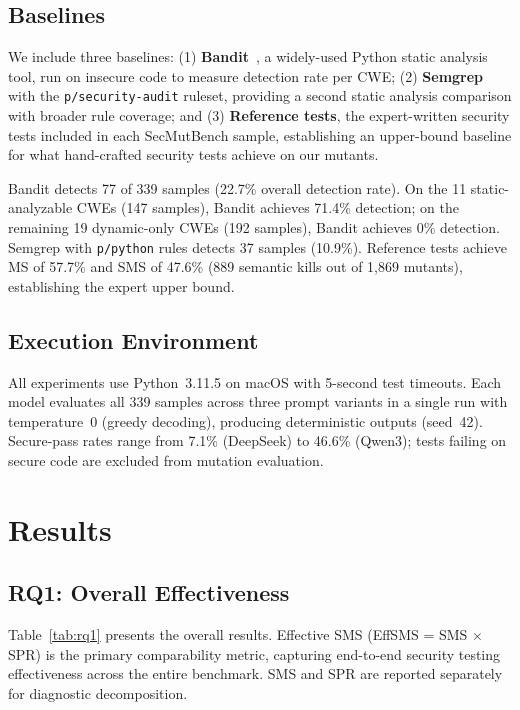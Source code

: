 \documentclass[sigconf,anonymous,review]{acmart}
\begin{document}
\subsection{Baselines}

We include three baselines: (1) \textbf{Bandit}~\cite{bandit2024}, a widely-used Python static analysis tool, run on insecure code to measure detection rate per CWE; (2) \textbf{Semgrep}~\cite{semgrep2024} with the \texttt{p/security-audit} ruleset, providing a second static analysis comparison with broader rule coverage; and (3) \textbf{Reference tests}, the expert-written security tests included in each SecMutBench sample, establishing an upper-bound baseline for what hand-crafted security tests achieve on our mutants.


Bandit detects 77 of 339 samples (22.7\% overall detection rate). On the 11 static-analyzable CWEs (147 samples), Bandit achieves 71.4\% detection; on the remaining 19 dynamic-only CWEs (192 samples), Bandit achieves 0\% detection. Semgrep with \texttt{p/python} rules detects 37 samples (10.9\%). Reference tests achieve MS of 57.7\% and SMS of 47.6\% (889 semantic kills out of 1,869 mutants), establishing the expert upper bound.



\subsection{Execution Environment}

All experiments use Python~3.11.5 on macOS with 5-second test timeouts. Each model evaluates all 339 samples across three prompt variants in a single run with temperature~0 (greedy decoding), producing deterministic outputs (seed~42). Secure-pass rates range from 7.1\% (DeepSeek) to 46.6\% (Qwen3); tests failing on secure code are excluded from mutation evaluation.


\section{Results}\label{sec:results}

\subsection{RQ1: Overall Effectiveness}

Table~\ref{tab:rq1} presents the overall results. Effective SMS (EffSMS = SMS $\times$ SPR) is the primary comparability metric, capturing end-to-end security testing effectiveness across the entire benchmark. SMS and SPR are reported separately for diagnostic decomposition.
\end{document}
